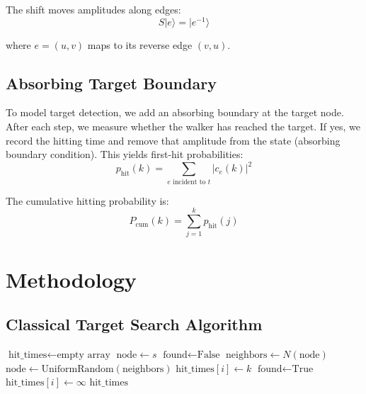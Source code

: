 \documentclass[12pt,a4paper]{article}
\begin{document}
The shift moves amplitudes along edges:
\begin{equation}
S |e\rangle = |e^{-1}\rangle
\end{equation}

where $e = (u, v)$ maps to its reverse edge $(v, u)$.

\subsection{Absorbing Target Boundary}

To model target detection, we add an absorbing boundary at the target node. After each step, we measure whether the walker has reached the target. If yes, we record the hitting time and remove that amplitude from the state (absorbing boundary condition). This yields first-hit probabilities:
\begin{equation}
p_{\text{hit}}(k) = \sum_{e \text{ incident to } t} |c_e(k)|^2
\end{equation}

The cumulative hitting probability is:
\begin{equation}
P_{\text{cum}}(k) = \sum_{j=1}^{k} p_{\text{hit}}(j)
\end{equation}

\section{Methodology}

\subsection{Classical Target Search Algorithm}

\begin{algorithm}[H]
\caption{Classical Random Walk Target Search}
\label{alg:classical}
\begin{algorithmic}[1]
    \State $\text{hit\_times} \gets \text{empty array}$
        \State $\text{node} \gets s$
        \State $\text{found} \gets \text{False}$
            \State $\text{neighbors} \gets N(\text{node})$
             \Break \EndIf
            \State $\text{node} \gets \text{UniformRandom}(\text{neighbors})$
                \State $\text{hit\_times}[i] \gets k$
                \State $\text{found} \gets \text{True}$
                \Break
            \EndIf
        \EndFor
            \State $\text{hit\_times}[i] \gets \infty$
        \EndIf
    \EndFor
    \State \Return $\text{hit\_times}$
    \EndProcedure
\end{algorithmic}
\end{algorithm}
\end{document}
